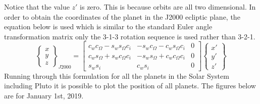 \documentclass{article}
\begin{document}
Notice that the value $z'$ is zero. This is because orbits are all two
dimensional. In order to obtain the coordinates of the planet in the
J2000 ecliptic plane, the equation below is used which is similar to
the standard Euler angle transformation matrix only the 3-1-3 rotation
sequence is used rather than 3-2-1. 
\begin{equation}
  \begin{Bmatrix} x \\ y \\ z \end{Bmatrix}_{J2000} = \begin{bmatrix} c_wc_{\Omega}-s_ws_{\Omega}c_i &
    -s_wc_{\Omega}-c_ws_{\Omega}c_i & 0
    \\ c_ws_{\Omega}+s_wc_{\Omega}c_i &
    -s_ws_{\Omega}+c_wc_{\Omega}c_i & 0 \\
    s_ws_i & c_ws_i & 0 \end{bmatrix} \begin{Bmatrix} x' \\ y' \\ z' \end{Bmatrix}
\end{equation}
Running through this formulation for all the planets in the Solar
System including Pluto it is possible to plot the position of all
planets. The figures below are for January 1st, 2019.
\end{document}
